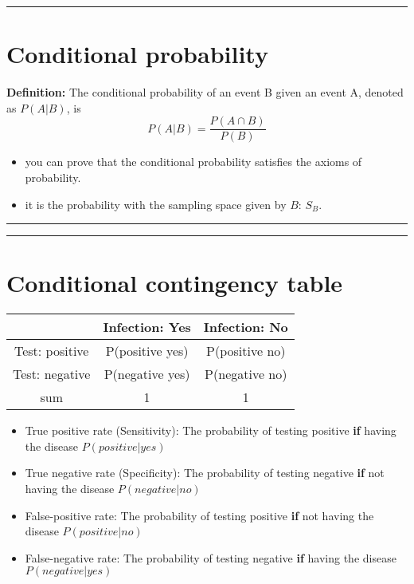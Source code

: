 \documentclass[
]{book}
\providecommand{\tightlist}{%
  \setlength{\itemsep}{0pt}\setlength{\parskip}{0pt}}
\begin{document}
\begin{center}\rule{0.5\linewidth}{0.5pt}\end{center}

\hypertarget{conditional-probability-2}{%
\section{Conditional probability}\label{conditional-probability-2}}

\textbf{Definition:}
The conditional probability of an event B given an event A, denoted as \(P(A|B)\), is
\[P(A|B) = \frac{P(A\cap B)}{P(B)}\]

\begin{itemize}
\tightlist
\item
  you can prove that the conditional probability satisfies the axioms of probability.
\item
  it is the probability with the sampling space given by \(B\): \(S_B\).
\end{itemize}

\begin{center}\rule{0.5\linewidth}{0.5pt}\end{center}

\begin{center}\rule{0.5\linewidth}{0.5pt}\end{center}

\hypertarget{conditional-contingency-table}{%
\section{Conditional contingency table}\label{conditional-contingency-table}}

\begin{longtable}[]{@{}ccc@{}}
\toprule
& Infection: Yes & Infection: No \\
\midrule
\endhead
Test: positive & P(positive {\textbar{}} yes) & P(positive {\textbar{}} no) \\
Test: negative & P(negative {\textbar{}} yes) & P(negative {\textbar{}} no) \\
sum & 1 & 1 \\
\bottomrule
\end{longtable}

\begin{itemize}
\item
  True positive rate (Sensitivity): The probability of testing positive \textbf{if} having the disease \(P(positive|yes)\)
\item
  True negative rate (Specificity): The probability of testing negative \textbf{if} not having the disease \(P(negative|no)\)
\item
  False-positive rate: The probability of testing positive \textbf{if} not having the disease \(P(positive|no)\)
\item
  False-negative rate: The probability of testing negative \textbf{if} having the disease \(P(negative|yes)\)
\end{itemize}
\end{document}
